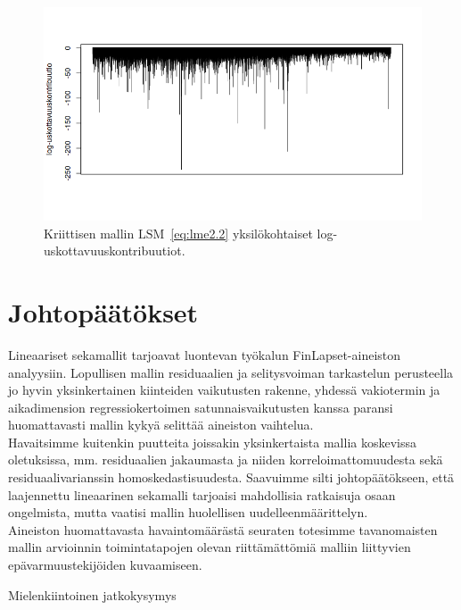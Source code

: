 \documentclass[finnish]{docopts}
\begin{document}
\begin{figure}[H]
\centering
  \includegraphics[scale=0.8]{kuvaajat/log.png}
  \caption{Kriittisen mallin $\text{LSM}$~\ref{eq:lme2.2} yksilökohtaiset log-uskottavuuskontribuutiot.}
  \label{fig:logkontrib}
\end{figure}

\section{Johtopäätökset}

Lineaariset sekamallit tarjoavat luontevan työkalun FinLapset-aineiston analyysiin. Lopullisen mallin residuaalien ja selitysvoiman tarkastelun perusteella jo hyvin yksinkertainen kiinteiden vaikutusten rakenne, yhdessä vakiotermin ja aikadimension regressiokertoimen satunnaisvaikutusten kanssa paransi huomattavasti mallin kykyä selittää aineiston vaihtelua.\\

Havaitsimme kuitenkin puutteita joissakin yksinkertaista mallia koskevissa oletuksissa, mm. residuaalien jakaumasta ja niiden korreloimattomuudesta sekä residuaalivarianssin homoskedastisuudesta. Saavuimme silti johtopäätökseen, että laajennettu lineaarinen sekamalli tarjoaisi mahdollisia ratkaisuja osaan ongelmista, mutta vaatisi mallin huolellisen uudelleenmäärittelyn.\\

Aineiston huomattavasta havaintomäärästä seuraten totesimme tavanomaisten mallin arvioinnin toimintatapojen olevan riittämättömiä malliin liittyvien epävarmuustekijöiden kuvaamiseen. 

Mielenkiintoinen jatkokysymys


\end{document}

